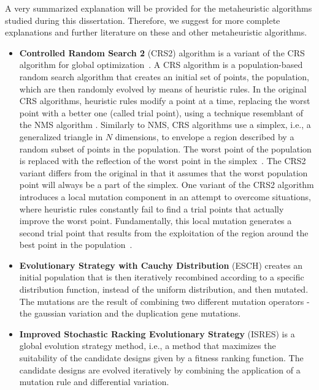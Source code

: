 A very summarized explanation will be provided for the metaheuristic algorithms studied during this dissertation. Therefore, we suggest \cite{BlumRoli2003Metaheuristics,Glover2003Metaheuristics} for more complete explanations and further literature on these and other metaheuristic algorithms.

\begin{itemize}
	\item \textbf{Controlled Random Search 2} (CRS2) algorithm is a variant of the CRS algorithm for global optimization~\cite{Price1983}. A CRS algorithm is a population-based random search algorithm that creates an initial set of points, the population, which are then randomly evolved by means of heuristic rules. In the original CRS algorithms, heuristic rules modify a point at a time, replacing the worst point with a better one (called trial point), using a technique resemblant of the NMS algorithm \cite{Nelder1964}. Similarly to NMS, CRS algorithms use a simplex, i.e., a generalized triangle in $N$ dimensions, to envelope a region described by a random subset of points in the population. The worst point of the population is replaced with the reflection of the worst point in the simplex~\cite{Kaelo2006CRS2}. The CRS2 variant differs from the original in that it assumes that the worst population point will always be a part of the simplex. One variant of the CRS2 algorithm introduces a local mutation component in an attempt to overcome situations,  where heuristic rules constantly fail to find a trial points that actually improve the worst point. Fundamentally, this local mutation generates a second trial point that results from the exploitation of the region around the best point in the population~\cite{Kaelo2006CRS2}.  
	
	\item \textbf{Evolutionary Strategy with Cauchy Distribution} (ESCH)  creates an initial population that is then iteratively recombined according to a specific distribution function, instead of the uniform distribution, and then mutated. The mutations are the result of combining two different mutation operators - the gaussian variation and the duplication gene mutations.
	
	\item \textbf{Improved Stochastic Racking Evolutionary Strategy} (ISRES)  is a global evolution strategy method, i.e., a method that maximizes the suitability of the candidate designs given by a fitness ranking function. The candidate designs are evolved iteratively by combining the application of a mutation rule and differential variation.
	

\end{itemize}
